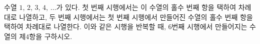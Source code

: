 수열 $1$, $2$, $3$, $4$, $\ldots$가 있다. 첫 번째 시행에서는 이 수열의 홀수 번째 항을 택하여 차례대로 나열하고, 두 번째 시행에서는 첫 번째 시행에서 만들어진 수열의 홀수 번째 항을 택하여 차례대로 나열한다. 이와 같은 시행을 반복할 때, $6$번째 시행에서 만들어지는 수열의 제$4$항을 구하시오.
